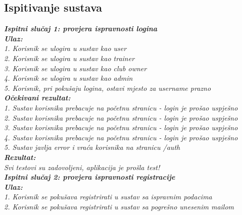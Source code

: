 			
			
			\subsection{Ispitivanje sustava}
			
			\textbf{\textit{Ispitni slučaj 1: provjera ispravnosti logina}}\\
			\textbf{\textit{Ulaz:}}\\
			
			 \textit{1. Korisnik se ulogira u sustav kao user}\\
			 \textit{2. Korisnik se ulogira u sustav kao trainer}\\
			 \textit{3. Korisnik se ulogira u sustav kao club owner}\\
			 \textit{4. Korisnik se ulogira u sustav kao admin}\\
			 \textit{5. Korisnik, pri pokušaju logina, ostavi mjesto za username prazno}\\

			 \textbf{\textit{Očekivani rezultat:}}\\

			 \textit{1. Sustav korisnika prebacuje na početnu stranicu - login je prošao uspješno}\\
			 \textit{2. Sustav korisnika prebacuje na početnu stranicu - login je prošao uspješno}\\
			 \textit{3. Sustav korisnika prebacuje na početnu stranicu - login je prošao uspješno}\\
			 \textit{4. Sustav korisnika prebacuje na početnu stranicu - login je prošao uspješno}\\
			 \textit{5. Sustav javlja error i vraća korisnika na stranicu /auth}\\

			 \textbf{\textit{Rezultat:}}\\
			 \textit{Svi testovi su zadovoljeni, aplikacija je prošla test!}\\

			 \textbf{\textit{Ispitni slučaj 2: provjera ispravnosti registracije}}\\
			 \textbf{\textit{Ulaz:}}\\
			 
			  \textit{1. Korisnik se pokušava registrirati u sustav sa ispravnim podacima}\\
			  \textit{2. Korisnik se pokušava registrirati u sustav sa pogrešno unesenim mailom}\\
 
